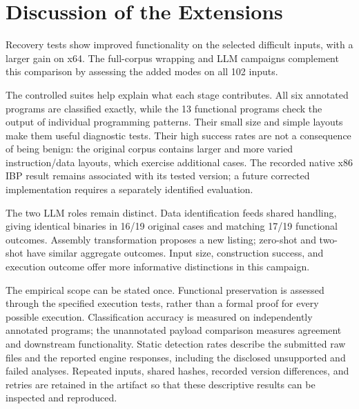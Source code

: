\section{Discussion of the Extensions}\label{sec:extension_limits}
Recovery tests show improved functionality on the selected difficult
inputs, with a larger gain on x64. The full-corpus wrapping and LLM
campaigns complement this comparison by assessing the added modes on all
102 inputs.

The controlled suites help explain what each stage contributes. All six
annotated programs are classified exactly, while the 13 functional
programs check the output of individual programming patterns. Their small
size and simple layouts make them useful diagnostic tests. Their high
success rates are not a consequence of being benign: the original corpus
contains larger and more varied instruction/data layouts, which exercise
additional cases. The recorded native x86 IBP result remains associated with its tested
version; a future corrected implementation requires a separately identified
evaluation.

The two LLM roles remain distinct. Data identification feeds shared
handling, giving identical binaries in 16/19 original cases and matching
17/19 functional outcomes. Assembly transformation proposes a new listing;
zero-shot and two-shot have similar aggregate outcomes. Input size,
construction success, and execution outcome offer more informative
distinctions in this campaign.

The empirical scope can be stated once. Functional preservation is assessed
through the specified execution tests, rather than a formal proof for every
possible execution. Classification accuracy is measured on independently
annotated programs; the unannotated payload comparison measures agreement
and downstream functionality. Static detection rates describe the submitted
raw files and the reported engine responses, including the disclosed
unsupported and failed analyses. Repeated inputs, shared hashes, recorded
version differences, and retries are retained in the artifact so that these
descriptive results can be inspected and reproduced.
